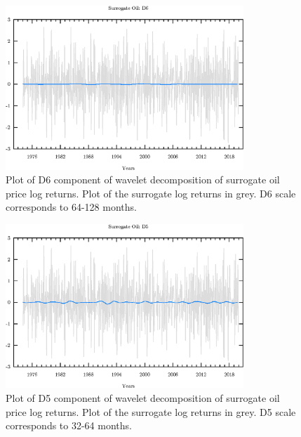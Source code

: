 \begin{figure}
\begin{center}
\includegraphics[width=0.8\textwidth]{./code/plot/surrogate_oil_wr_D6.eps}
\caption{Plot of D6 component of wavelet decomposition of surrogate oil price log returns. 
	Plot of the surrogate log returns in grey. D6 scale corresponds to 64-128 months.}
\end{center}
\label{fig:s-oil-wr-d6}
\end{figure}

\begin{figure}
\begin{center}
\includegraphics[width=0.8\textwidth]{./code/plot/surrogate_oil_wr_D5.eps}
\caption{Plot of D5 component of wavelet decomposition of surrogate oil price log returns. 
	Plot of the surrogate log returns in grey. D5 scale corresponds to 32-64 months.}
\end{center}
\label{fig:s-oil-wr-d5}
\end{figure}

